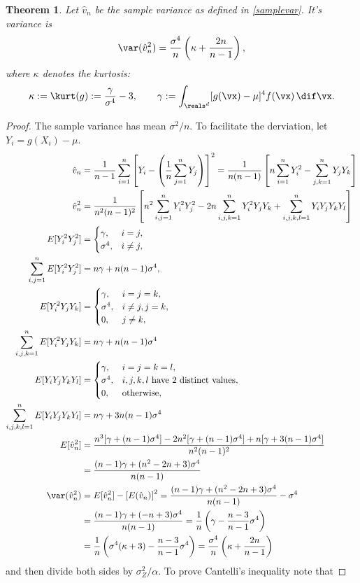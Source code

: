\documentclass[12pt]{amsart}
\newcommand{\hv}{\hat{v}}
\newtheorem{theorem}{Theorem}
\begin{document}
\begin{theorem} \label{Varvarthm} Let $\hv_n$ be the sample variance as defined in \eqref{samplevar}.  It's variance is
\[
\var(\hv_n^2) = \frac{\sigma^4}{n} \left ( \kappa  + \frac{2n}{n-1}\right),
\]
where $\kappa$ denotes the \emph{kurtosis}:
\begin{equation} \label{kurtdef}
\kappa := \kurt(g) := \frac{\gamma}{\sigma^4} -3 , \qquad \gamma := \int_{\reals^d} [g(\vx)-\mu]^4 f(\vx) \, \dif \vx.
\end{equation}
\end{theorem}
\begin{proof}The sample variance has mean $\sigma^2/n$.  To facilitate the derviation, let $Y_i=g(X_i) - \mu$.
\begin{align*}
\hv_n & =  \frac 1{n-1} \sum_{i=1}^n \left[Y_i- \left(\frac 1n \sum_{j=1}^n Y_j\right) \right]^2 
=  \frac 1{n(n-1)}\left[ n \sum_{i=1}^n Y^2_i-  \sum_{j,k=1}^n Y_jY_k \right] \\
\hv_n^2 & = \frac 1{n^2(n-1)^2}\left[ n^2 \sum_{i,j=1}^n Y^2_i Y^2_j  - 2 n \sum_{i,j,k=1}^n Y^2_i Y_j Y_k +  \sum_{i,j,k,l=1}^n Y_iY_j Y_k Y_l\right] \\
E[ Y^2_i Y^2_j] & = \begin{cases} \gamma, & i=j,\\
\sigma^4, & i \ne j,
\end{cases}\\
\sum_{i,j=1}^n E[Y^2_i Y^2_j]&= n \gamma + n(n-1)\sigma^4, \\
E[ Y^2_i Y_j Y_k] & = \begin{cases} \gamma, & i=j=k,\\
\sigma^4, & i \ne j, j=k,\\
0, & j \ne k,
\end{cases} \\
\sum_{i,j,k=1}^n E[Y^2_i Y_j Y_k] &= n\gamma  + n(n-1)\sigma^4 \\
E[ Y_i Y_j Y_k Y_l] & = \begin{cases} \gamma, & i=j=k=l,\\
\sigma^4, & i, j, k, l \text{ have 2 distinct values},\\
0, & \text{otherwise},
\end{cases}\\
\sum_{i,j,k,l=1}^n E[Y_iY_j Y_k Y_l] &= n \gamma + 3n(n-1)\sigma^4 \\
E[\hv_n^2] & = \frac{ n^3[\gamma + (n-1)\sigma^4]  - 2 n^2 [\gamma + (n-1)\sigma^4] +  n[\gamma + 3(n-1)\sigma^4]} {n^2(n-1)^2} \\
& = \frac{ (n-1)\gamma + (n^2-2n+3)\sigma^4} {n(n-1)} \\
\var(\hv_n^2) & = E[\hv_n^2] - \left[E(\hv_n)\right]^2 = \frac{ (n-1)\gamma + (n^2-2n+3)\sigma^4} {n(n-1)} -\sigma^4\\
& = \frac{(n-1)\gamma + (-n+3)\sigma^4} {n(n-1)}= \frac{1}{n} \left ( \gamma - \frac{n-3}{n-1} \sigma^4 \right)\\
& = \frac{1}{n} \left ( \sigma^4(\kappa +3) - \frac{n-3}{n-1} \sigma^4 \right) = \frac{\sigma^4}{n} \left ( \kappa  + \frac{2n}{n-1}\right)
\end{align*}
and then divide both sides by $\sigma^2_Z/\alpha$. To prove Cantelli's inequality note that
\end{proof}
\end{document}
